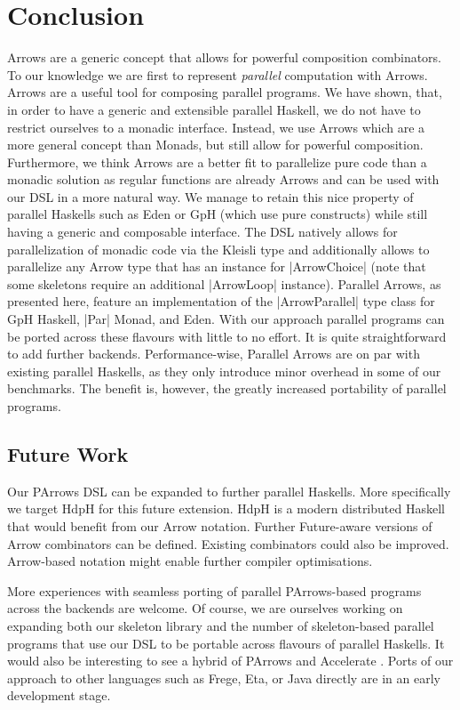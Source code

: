 
\section{Conclusion}
\label{sec:conclusion}
Arrows are a generic concept that allows for powerful composition
combinators. To our knowledge we are first to represent
\emph{parallel} computation with Arrows.
%
Arrows are a useful tool for composing parallel
programs. We have shown, that, in order to have a generic and extensible parallel Haskell, we do not have to restrict ourselves to a monadic interface. Instead, we use Arrows which are a more general concept than Monads, but still allow for powerful composition. Furthermore, we think Arrows are a better fit to parallelize pure code than a monadic solution as regular functions are already Arrows and can be used with our DSL in a more natural way. We manage to retain this nice property of parallel Haskells such as Eden or GpH (which use pure constructs) while still having a generic and composable interface.
%
The DSL natively allows for parallelization of monadic code via the Kleisli type and additionally allows to parallelize any Arrow type that has an instance for |ArrowChoice| (note that some skeletons require an additional |ArrowLoop| instance).
%
Parallel Arrows, as presented here, feature an implementation of the |ArrowParallel| type class for GpH Haskell, |Par| Monad, and Eden. With our approach parallel programs can be ported across these flavours with little to no effort. It is quite straightforward to add further backends.
%
%
Performance-wise, Parallel Arrows are on par with existing parallel Haskells, as they only introduce minor overhead in some of our benchmarks.
%
The benefit is, however, the greatly increased portability of parallel programs.



\subsection{Future Work}
\label{sec:future-work}

Our PArrows DSL can be expanded to further parallel Haskells. More specifically we target HdpH \cite{Maier:2014:HDS:2775050.2633363} for this future extension. HdpH is a modern distributed Haskell that would benefit from our Arrow notation. Further Future-aware versions of Arrow combinators can be defined. Existing combinators could also be improved.
Arrow-based notation might enable further compiler optimisations.

More experiences with seamless porting of parallel PArrows-based programs across the backends are welcome.
Of course, we are ourselves working on expanding both our skeleton library and the number of skeleton-based parallel programs that use our DSL to be portable across flavours of parallel Haskells.
It would also be interesting to see a hybrid of PArrows and Accelerate \cite{McDonell:2015:TRC:2887747.2804313}.
Ports of our approach to other languages such as Frege, Eta, or Java directly are in an early development stage.
